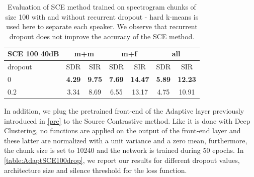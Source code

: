 \documentclass[master, tikz, final,11pt, dvipdfmx]{iscs-thesis}
\begin{document}
\begin{table}[h]
\centering
\begin{tabular}{l|c|c|c|c|c|c}
SCE 100 40dB & \multicolumn{2}{c|}{m+m} & \multicolumn{2}{c|}{m+f} & \multicolumn{2}{c}{all} \\ 
\hline 
dropout & SDR & SIR & SDR & SIR & SDR & SIR  \\ 
\hline 
0 & \textbf{4.29} & \textbf{9.75} & \textbf{7.69} & \textbf{14.47} & \textbf{5.89} & \textbf{12.23} \\ 
0.2 & 3.34 & 8.69 &  6.55 & 13.17 & 4.75 & 10.91 \\ 
\end{tabular}
\caption[Evaluation of SCE method trained on spectrogram chunks of size 100 with and without recurrent dropout]{Evaluation of SCE method trained on spectrogram chunks of size 100 with and without recurrent dropout - hard k-means is used here to separate each speaker. We observe that recurrent dropout does not improve the accuracy of the SCE method.}
\label{table:SCE100drop}
\end{table}


In addition, we plug the pretrained front-end of the Adaptive layer previously introduced in \autoref{pre} to the Source Contrastive method. Like it is done with Deep Clustering, no functions are applied on the output of the front-end layer and these latter are normalized with a unit variance and a zero mean, furthermore, the chunk size is set to 10240 and the network is trained during 50 epochs.
In \autoref{table:AdaptSCE100drop}, we report our results for different dropout values, architecture size and silence threshold for the loss function.
\end{document}
